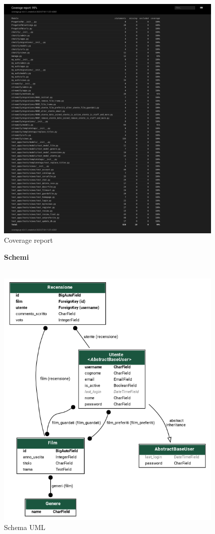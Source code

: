 \documentclass[12pt]{article}
\begin{document}
	\centering \includegraphics[width=11cm, ]{Immagini/coverage_report.png} \\
	\centering Coverage report

	\pagebreak
	
	
	\noindent \centerline {\Huge \textbf{Schemi}} \\
	\centering \includegraphics[width=11cm, ]{Immagini/streamify.png} \\
	\centering Schema UML
	
	
	
	
\end{document}
